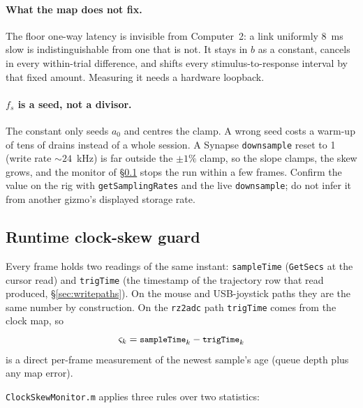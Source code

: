 \documentclass[11pt,a4paper]{article}
\newcommand{\code}[1]{\texttt{\small #1}}
\newcommand{\file}[1]{\texttt{\small #1}}
\begin{document}
\paragraph{What the map does not fix.} The floor one-way latency is invisible
from Computer~2: a link uniformly 8~ms slow is indistinguishable from one that
is not. It stays in $b$ as a constant, cancels in every within-trial
difference, and shifts every stimulus-to-response interval by that fixed
amount. Measuring it needs a hardware loopback.

\paragraph{$f_s$ is a seed, not a divisor.} The constant only seeds $a_0$ and
centres the clamp. A wrong seed costs a warm-up of tens of drains instead of a
whole session. A Synapse \code{downsample} reset to 1 (write rate
$\sim\!24$~kHz) is far outside the $\pm 1\%$ clamp, so the slope clamps, the
skew grows, and the monitor of \S\ref{sec:skew} stops the run within a few
frames. Confirm the value on the rig with \code{getSamplingRates} and the live
\code{downsample}; do not infer it from another gizmo's displayed storage rate.

\subsection{Runtime clock-skew guard}
\label{sec:skew}

Every frame holds two readings of the same instant: \code{sampleTime}
(\code{GetSecs} at the cursor read) and \code{trigTime} (the timestamp of the
trajectory row that read produced, \S\ref{sec:writepaths}). On the mouse and
USB-joystick paths they are the same number by construction. On the
\code{rz2adc} path \code{trigTime} comes from the clock map, so
\begin{equation}
  \varsigma_k = \code{sampleTime}_k - \code{trigTime}_k
  \label{eq:skew}
\end{equation}
is a direct per-frame measurement of the newest sample's age (queue depth plus
any map error).

\file{ClockSkewMonitor.m} applies three rules over two statistics:
\end{document}
